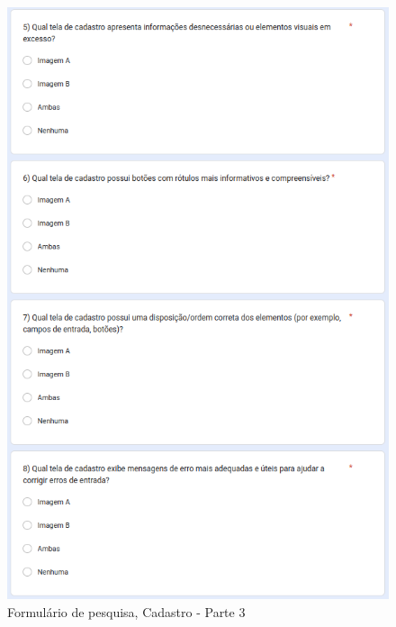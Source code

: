 \begin{figure}[!h]
	\begin{center}
	    \includegraphics[scale=0.6]{figs/Form/11.png}
	\end{center}
	\caption{\label{AP_CP03}Formulário de pesquisa, Cadastro - Parte 3}
\end{figure}

\newpage

